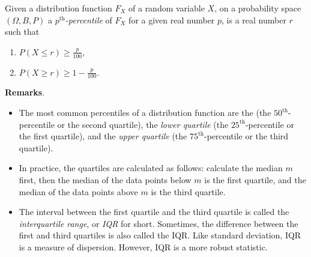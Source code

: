 \documentclass[12pt]{article}
\begin{document}
Given a distribution  function $F_X$ of a random variable $X$, on a probability space $(\Omega, B, P)$ a \emph{$p^{\text{th}}$-percentile} of $F_X$ for a given real number $p$, is a real number $r$ such that 
\begin{enumerate}
\item
$\displaystyle P(X\leq r)\geq \frac{p}{100},$
\item
$\displaystyle P(X\geq r)\geq 1-\frac{p}{100}.$
\end{enumerate}


\textbf{Remarks}.  
\begin{itemize}
\item
The most common percentiles of a distribution function are the  (the $50^{\text{th}}$-percentile or the second quartile), the \emph{lower quartile} (the $25^{\text{th}}$-percentile or the first quartile), and the \emph{upper quartile} (the $75^{\text{th}}$-percentile or the third quartile).  
\item
In practice, the quartiles are calculated as follows: calculate the median $m$ first, then the median of the data points below $m$ is the first quartile, and the median of the data points above $m$ is the third quartile.
\item
The interval between the first quartile and the third quartile is called the \emph{interquartile range}, or \emph{IQR} for short.  Sometimes, the difference between the first and third quartiles is also called the IQR.  Like standard deviation, IQR is a measure of dispersion.  However, IQR is a more robust statistic.
\end{itemize}
\end{document}
